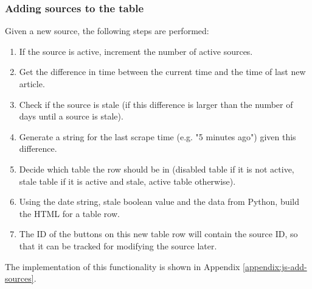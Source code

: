 \documentclass{l4proj}
\begin{document}
\subsubsection{Adding sources to the table} \hfill \par
Given a new source, the following steps are performed:
\begin{enumerate}
    \item If the source is active, increment the number of active sources.
    \item Get the difference in time between the current time and the time of last new article.
    \item Check if the source is stale (if this difference is larger than the number of days until a source is stale).
    \item Generate a string for the last scrape time (e.g. "5 minutes ago") given this difference.
    \item Decide which table the row should be in (disabled table if it is not active, stale table if it is active and stale, active table otherwise).
    \item Using the date string, stale boolean value and the data from Python, build the HTML for a table row.
    \item The ID of the buttons on this new table row will contain the source ID, so that it can be tracked for modifying the source later.    
\end{enumerate}
The implementation of this functionality is shown in Appendix \ref{appendix:js-add-sources}.
\end{document}

